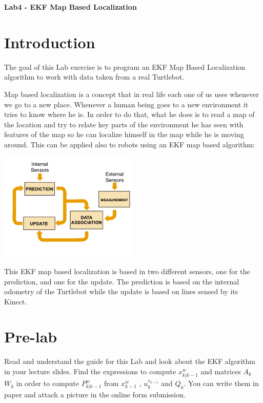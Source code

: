 \documentclass[a4paper,10pt]{article}
\begin{document}
\marginsize{2cm}{2cm}{2cm}{2cm}

\begin{center}
\Large \textbf{Lab4 - EKF Map Based Localization}
\end{center}

\section{Introduction}

The goal of this Lab exercise is to program an EKF Map Based Localization algorithm to work with data taken from a real Turtlebot.

Map based localization is a concept that in real life each one of us uses whenever we go to a new place. Whenever a human being goes to a new environment it tries to know where he is. In order to do that, what he does is to read a map of the location and try to relate key parts of the environment he has seen with features of the map so he can localize himself in the map while he is moving around. This can be applied also to robots using an EKF map based algorithm:

\begin{center}
	\includegraphics[width=0.50\textwidth]{pict/ekf_pic.png}
	\label{measur}
\end{center}

This EKF map based localization is based in two different sensors, one for the prediction, and one for the update. The prediction is based on the internal odometry of the Turtlebot while the update is based on lines sensed by its Kinect.

\section{Pre-lab}

Read and understand the guide for this Lab and look about the EKF algorithm in your lecture slides.
Find the expressions to compute $x_{k|k-1}^w $ and matrices $A_k$ $W_k$ in order to compute $ P_{k|k-1}^w$ from $x_{k-1}^w$ , $u_k^{r_{k-1}}$ and $Q_k$.
You can write them in paper and attach a picture in the online form submission.
\end{document}

